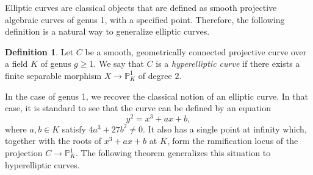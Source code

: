 \documentclass[a4paper, 12pt]{amsart}
\theoremstyle{definition}
\newtheorem{defn0}{Definition}[section]
\theoremstyle{plain}
\theoremstyle{plain}
\theoremstyle{plain}
\theoremstyle{plain}
\theoremstyle{remark}
\theoremstyle{remark}
\theoremstyle{plain}
\newenvironment{definition}{ \begin{defn0}}{\end{defn0}}
\begin{document}
	Elliptic curves are classical objects that are defined as smooth projective algebraic curves of genus 1, with a specified point. Therefore, the following definition is a natural way to generalize elliptic curves.
	\begin{definition}
		Let $C$ be a smooth, geometrically connected projective curve over a field $K$ of genus $g\ge 1$. We say that $C$ is a \emph{hyperelliptic curve} if there exists a finite separable morphism $X\rightarrow\mathbb{P}^1_K$ of degree $2$.
	\end{definition}
	
	In the case of genus 1, we recover the classical notion of an elliptic curve. In that case, it is standard to see that the curve can be defined by an equation
	\begin{equation*}
		y^2=x^3+ax+b,
	\end{equation*}
	where $a,b\in K$ satisfy $4a^3+27b^2\neq 0$. It also has a single point at infinity which, together with the roots of $x^3+ax+b$ at $\overline{K}$, form the ramification locus of the projection $C\rightarrow\mathbb{P}^1_K$. The following theorem generalizes this situation to hyperelliptic curves.
	
\end{document}
